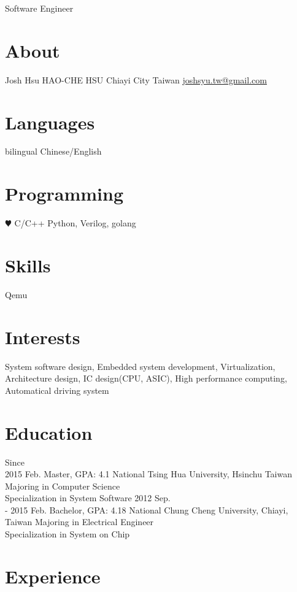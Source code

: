 \documentclass[]{friggeri-cv}
\begin{document}
       {Software Engineer}


\begin{aside}
  \section{About}
    Josh Hsu
    HAO-CHE HSU
	Chiayi City
    Taiwan
	\href{joshsyu.tw@gmail.com}{joshsyu.tw@gmail.com}
  \section{Languages}
    bilingual Chinese/English
  \section{Programming}
    {\color{red} $\varheartsuit$} C/C++
    Python, Verilog, golang
  \section{Skills} 
  	Qemu
\end{aside}

\section{Interests}

System software design, Embedded system development,
Virtualization, Architecture design, IC design(CPU, ASIC), 
High performance computing, Automatical driving system
\section{Education}

\begin{entrylist}
  \entry
    {Since \\
	 2015 Feb.}
    {Master, GPA: 4.1}
    {National Tsing Hua University, Hsinchu Taiwan}
	{Majoring in Computer Science \\
	Specialization in System Software}
  \entry
    {2012 Sep. \\
	- 2015 Feb.}
    {Bachelor, GPA: 4.18}
    {National Chung Cheng University, Chiayi, Taiwan}
	{Majoring in Electrical Engineer \\
	Specialization in System on Chip}
\end{entrylist}

\section{Experience}
\end{document}
